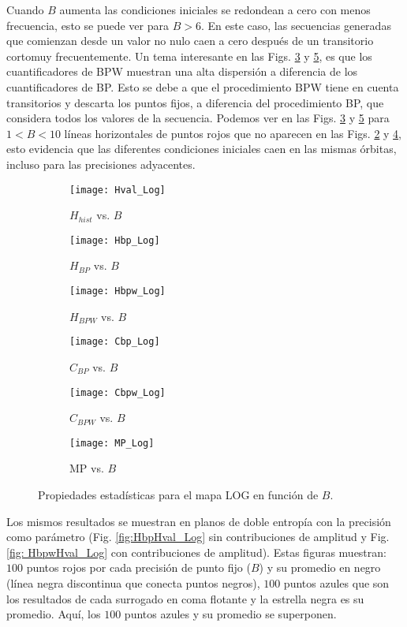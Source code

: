 Cuando $B$ aumenta las condiciones iniciales se redondean a cero con menos frecuencia, esto se puede ver para $B > 6$.
En este caso, las secuencias generadas que comienzan desde un valor no nulo caen a cero después de un transitorio cortomuy frecuentemente.
Un tema interesante en las Figs. \ref{fig:Hbpw_Log} y \ref{fig:Cbpw_Log}, es que los cuantificadores de BPW muestran una alta dispersión a diferencia de los cuantificadores de BP.
Esto se debe a que el procedimiento BPW tiene en cuenta transitorios y descarta los puntos fijos, a diferencia del procedimiento BP, que considera todos los valores de la secuencia.
Podemos ver en las Figs. \ref{fig:Hbpw_Log} y \ref{fig:Cbpw_Log} para $1 < B < 10$ líneas horizontales de puntos rojos que no aparecen en las Figs. \ref{fig:Hbp_Log} y \ref{fig:Cbp_Log}, esto evidencia que las diferentes condiciones iniciales caen en las mismas órbitas, incluso para las precisiones adyacentes.
%
\begin{figure}[htpb]
	\centering
	\begin{subfigure}[b]{0.49\textwidth}
		\texttt{[image: Hval\_Log]}
		\caption{$H_{hist}$ vs. $B$}
		\label{fig:Hval_Log}
	\end{subfigure}
	\begin{subfigure}[b]{0.49\textwidth}
		\texttt{[image: Hbp\_Log]}
		\caption{$H_{BP}$ vs. $B$}
		\label{fig:Hbp_Log}
	\end{subfigure}
	\begin{subfigure}[b]{0.49\textwidth}
		\texttt{[image: Hbpw\_Log]}
		\caption{$H_{BPW}$ vs. $B$}
		\label{fig:Hbpw_Log}
	\end{subfigure}
	\begin{subfigure}[b]{0.49\textwidth}
		\texttt{[image: Cbp\_Log]}
		\caption{$C_{BP}$ vs. $B$}
		\label{fig:Cbp_Log}
	\end{subfigure}
	\begin{subfigure}[b]{0.49\textwidth}
		\texttt{[image: Cbpw\_Log]}
		\caption{$C_{BPW}$ vs. $B$}
		\label{fig:Cbpw_Log}
	\end{subfigure}
	\begin{subfigure}[b]{0.49\textwidth}
		\texttt{[image: MP\_Log]}
		\caption{MP vs. $B$}
		\label{fig:MP_Log}
	\end{subfigure}
	\caption{Propiedades estadísticas para el mapa LOG en función de $B$.}
	\label{fig:LOG_QuantiB}
\end{figure}

Los mismos resultados se muestran en planos de doble entropía con la precisión como parámetro (Fig. \ref{fig:HbpHval_Log} sin contribuciones de amplitud y Fig. \ref{fig: HbpwHval_Log} con contribuciones de amplitud).
Estas figuras muestran: $100$ puntos rojos por cada precisión de punto fijo ($B$) y su promedio en negro (línea negra discontinua que conecta puntos negros), $100$ puntos azules que son los resultados de cada surrogado en coma flotante y la estrella negra es su promedio.
Aquí, los $100$ puntos azules y su promedio se superponen.

